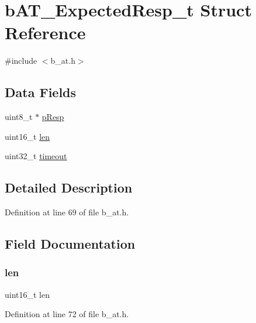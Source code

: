 \hypertarget{structb_a_t___expected_resp__t}{}\section{b\+A\+T\+\_\+\+Expected\+Resp\+\_\+t Struct Reference}
\label{structb_a_t___expected_resp__t}


{\ttfamily \#include $<$b\+\_\+at.\+h$>$}

\subsection*{Data Fields}
\begin{DoxyCompactItemize}
\item 
uint8\+\_\+t $\ast$ \mbox{\hyperlink{structb_a_t___expected_resp__t_afbabeec77450dafca17a2ff622b9735b}{p\+Resp}}
\item 
uint16\+\_\+t \mbox{\hyperlink{structb_a_t___expected_resp__t_a8aed22e2c7b283705ec82e0120515618}{len}}
\item 
uint32\+\_\+t \mbox{\hyperlink{structb_a_t___expected_resp__t_ab5627d8d8b095c198e2523c44ca380ac}{timeout}}
\end{DoxyCompactItemize}


\subsection{Detailed Description}


Definition at line 69 of file b\+\_\+at.\+h.



\subsection{Field Documentation}
\mbox{\label{structb_a_t___expected_resp__t_a8aed22e2c7b283705ec82e0120515618}} 
\subsubsection{\texorpdfstring{len}{len}}
{\footnotesize\ttfamily uint16\+\_\+t len}



Definition at line 72 of file b\+\_\+at.\+h.

